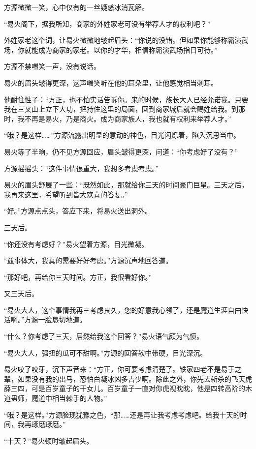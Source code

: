 \begin{this_body}
方源微微一笑，心中仅有的一丝疑惑冰消瓦解。

“易火阁下，据我所知，商家的外姓家老可没有举荐人才的权利吧？”

外姓家老这个词，让易火微微地皱起眉头：“你说的没错。但如果你能够称霸演武场，你就能成为商家的家老。以你的才华，相信称霸演武场指日可待。”

方源不禁嗤笑一声，没有说话。

易火的眉头皱得更深，这声嗤笑听在他的耳朵里，让他感觉相当刺耳。

他耐住性子：“方正，也不怕实话告诉你。来的时候，族长大人已经允诺我。只要我在三叉山上立下大功，把持住这里的局面，回到商家城后就会赐姓给我。到那时，我不再是易火，乃是商火。成为商家族人，我也就有权利来举荐人才。”

“哦？是这样……”方源流露出明显的意动的神色，目光闪烁着，陷入沉思当中。

易火等了半晌，仍不见方源回应，眉头皱得更深，问道：“你考虑好了没有？”

方源摇摇头：“这件事情很重大，我想多考虑考虑。”

易火的眉头舒展了一些：“既然如此，那就给你三天的时间豪门巨星。三天之后，我再来这里，希望听到皆大欢喜的答复。”

“好。”方源点点头，答应下来，将易火送出洞外。

三天后。

“你还没有考虑好？”易火望着方源，目光微凝。

“兹事体大，我真的需要好好考虑。”方源沉声地回答道。

“那好吧，再给你三天时间。方正，我很看好你。”

又三天后。

“易火大人，这个事情我再三考虑良久，您的好意我心领了，还是魔道生涯自由快活啊。”方源一脸恳切地道。

“什么？你考虑了三天，居然给我这个回答？”易火语气颇为气愤。

“易火大人，强扭的瓜可不甜啊。”方源的回答软中带硬，目光深沉。

易火咬了咬牙，沉下声音来：“方正，你可要考虑清楚了。铁家四老不是易于之辈，如果没有我的出马，恐怕白凝冰凶多吉少啊。除此之外，你先去斩杀的飞天虎薛三四，可是百岁童子的干女儿。百岁童子一直对你虎视眈眈，他是四转高阶的木道蛊师，魔道中相当棘手的人物。”

“哦？是这样。”方源脸现犹豫之色，“那……还是再让我考虑考虑吧。给我十天的时间，我再琢磨琢磨。”

“十天？”易火顿时皱起眉头。


\end{this_body}
